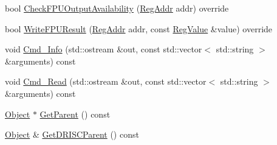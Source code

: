 \begin{DoxyCompactItemize}
bool \hyperlink{class_simulator_1_1drisc_1_1_register_file_a86ac6b5b63a1a662b694c2a76e86ad04}{Check\+F\+P\+U\+Output\+Availability} (\hyperlink{struct_simulator_1_1_reg_addr}{Reg\+Addr} addr) override
\item 
bool \hyperlink{class_simulator_1_1drisc_1_1_register_file_a87e2d2856c9dd19a8b8b2dc9ebd7e937}{Write\+F\+P\+U\+Result} (\hyperlink{struct_simulator_1_1_reg_addr}{Reg\+Addr} addr, const \hyperlink{struct_simulator_1_1_reg_value}{Reg\+Value} \&value) override
\item 
void \hyperlink{class_simulator_1_1drisc_1_1_register_file_a1b39897b56448e388ae4e0cadb846580}{Cmd\+\_\+\+Info} (std\+::ostream \&out, const std\+::vector$<$ std\+::string $>$ \&arguments) const 
\item 
void \hyperlink{class_simulator_1_1drisc_1_1_register_file_a0313685824cc3a566309b5e3718bf92c}{Cmd\+\_\+\+Read} (std\+::ostream \&out, const std\+::vector$<$ std\+::string $>$ \&arguments) const 
\item 
\hyperlink{class_simulator_1_1_object}{Object} $\ast$ \hyperlink{class_simulator_1_1drisc_1_1_register_file_a9fe65c5a3c9a8c92a0e9e451b841e608}{Get\+Parent} () const 
\item 
\hyperlink{class_simulator_1_1_object}{Object} \& \hyperlink{class_simulator_1_1drisc_1_1_register_file_a3046ae10d7494e0a1d7ba1de38ab428b}{Get\+D\+R\+I\+S\+C\+Parent} () const 
\end{DoxyCompactItemize}
